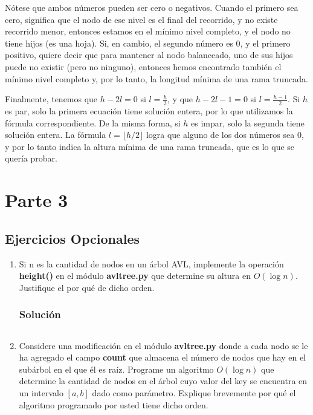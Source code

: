 \documentclass{article}
\begin{document}
Nótese que ambos números pueden ser cero o negativos. Cuando el primero sea cero, significa que el nodo de ese nivel es el final del recorrido, y no existe recorrido menor, entonces estamos en el mínimo nivel completo, y el nodo no tiene hijos (es una hoja). Si, en cambio, el segundo número es 0, y el primero positivo, quiere decir que para mantener al nodo balanceado, uno de sus hijos puede no existir (pero no ninguno), entonces hemos encontrado también el mínimo nivel completo y, por lo tanto, la longitud mínima de una rama truncada.

Finalmente, tenemos que $h-2l=0$ si $l=\frac{h}{2}$, y que $h-2l-1=0$ si $l=\frac{h-1}{2}$. Si $h$ es par, solo la primera ecuación tiene solución entera, por lo que utilizamos la fórmula correspondiente. De la misma forma, si $h$ es impar, solo la segunda tiene solución entera. La fórmula $l = \lfloor h/2 \rfloor$ logra que alguno de los dos números sea 0, y por lo tanto indica la altura mínima de una rama truncada, que es lo que se quería probar.


\section*{Parte 3}
\subsection*{Ejercicios Opcionales}
\begin{enumerate}
    \item Si n es la cantidad de nodos en un árbol AVL, implemente la operación \textbf{height()} en el módulo \textbf{avltree.py} que determine su altura en $O(\log n)$. Justifique el por qué de dicho orden.
    \subsubsection*{Solución}
    \inputminted{python3}{./code/snippets/ejercicioopcional1.py}
    
    \item Considere una modificación en el módulo \textbf{avltree.py} donde a cada nodo se le ha agregado el campo \textbf{count} que almacena el número de nodos que hay en el subárbol en el que él es raíz. Programe un algoritmo $O(\log n)$ que determine la cantidad de nodos en el árbol cuyo valor del key se encuentra en un intervalo $[a, b]$ dado como parámetro. Explique brevemente por qué el algoritmo programado por usted tiene dicho orden.
\end{enumerate}
\end{document}
